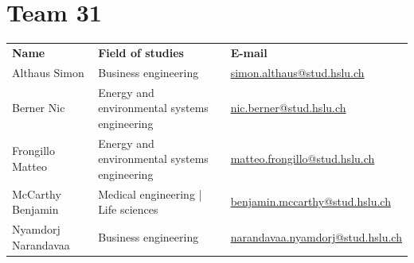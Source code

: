 \documentclass{article}
\begin{document}
\newpage
\section*{Team 31}
\renewcommand{\arraystretch}{1.5}
\begin{tabular}{@{}p{}p{}p{}@{}}
\textbf{Name} & \textbf{Field of studies} & \textbf{E-mail} \\
Althaus Simon & Business engineering & \href{mailto:simon.althaus@stud.hslu.ch}{simon.althaus@stud.hslu.ch} \\
Berner Nic & Energy and environmental systems engineering & \href{mailto:nic.berner@stud.hslu.ch}{nic.berner@stud.hslu.ch} \\
Frongillo Matteo & Energy and environmental systems engineering & \href{mailto:matteo.frongillo@stud.hslu.ch}{matteo.frongillo@stud.hslu.ch} \\
McCarthy Benjamin & Medical engineering | Life sciences & \href{mailto:benjamin.mccarthy@stud.hslu.ch}{benjamin.mccarthy@stud.hslu.ch} \\
Nyamdorj Narandavaa & Business engineering & \href{mailto:narandavaa.nyamdorj@stud.hslu.ch}{narandavaa.nyamdorj@stud.hslu.ch} \\
\end{tabular}
\end{document}

